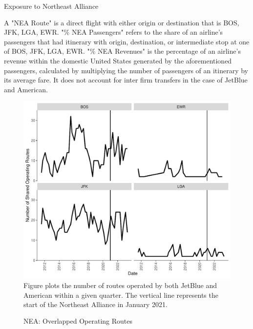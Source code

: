 \documentclass{article}
\begin{document}
\begin{appendices}
	\begin{landscape}
		\begin{table}
			\caption{Exposure to Northeast Alliance}
			\label{tab:NEA_Exposure}
			
			\begin{minipage}{\textwidth} %
				{\footnotesize A "NEA Route" is a direct flight with either origin or destination that is BOS, JFK, LGA, EWR. "\% NEA Passengers" refers to the share of an airline's passengers that had itinerary with origin, destination, or intermediate stop at one of BOS, JFK, LGA, EWR. "\% NEA Revenues"  is the percentage of an airline's revenue within the domestic United States generated by the aforementioned passengers, calculated by multiplying the number of passengers of an itinerary by its average fare. It does not account for inter firm transfers in the case of JetBlue and American.}
			\end{minipage}
		\end{table}
	\end{landscape}

    \begin{figure}
        \caption{NEA: Overlapped Operating Routes}
        \label{fig:NEA_Operating}
        \includegraphics[width = \linewidth]{05.Figures/NEA_Operating_Graph.pdf}
        \footnotesize{Figure plots the number of routes operated by both JetBlue and American within a given quarter. The vertical line represents the start of the Northeast Alliance in January 2021.}
    \end{figure}


\end{appendices}
\end{document}
